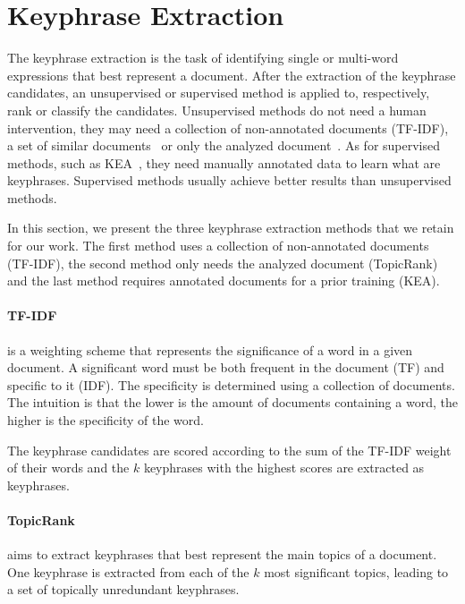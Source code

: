 \section{Keyphrase Extraction}
\label{sec:keyphrase_extraction}
  The keyphrase extraction is the task of identifying single or multi-word
  expressions that best represent a document. After the extraction of the
  keyphrase candidates, an unsupervised or supervised method is applied to,
  respectively, rank or classify the candidates. Unsupervised methods do not
  need a human intervention, they may need a collection of non-annotated
  documents (TF-IDF), a set of similar
  documents~\cite[ExpandRank]{wan2008expandrank} or only the analyzed
  document~\cite[TopicRank]{bougouin2013topicrank}. As for supervised methods,
  such as KEA~\cite{witten1999kea}, they need manually annotated data to learn
  what are keyphrases. Supervised methods usually achieve better results than
  unsupervised methods.

  In this section, we present the three keyphrase extraction methods that we
  retain for our work. The first method uses a collection of non-annotated
  documents (TF-IDF), the second method only needs the analyzed document
  (TopicRank) and the last method requires annotated documents for a prior
  training (KEA).

  \paragraph{TF-IDF} is a weighting scheme that represents the significance of a
  word in a given document. A significant word must be both frequent in the
  document (TF) and specific to it (IDF). The specificity is determined using a
  collection of documents. The intuition is that the lower is the amount of
  documents containing a word, the higher is the specificity of the word.

  The keyphrase candidates are scored according to the sum of the TF-IDF weight
  of their words and the $k$ keyphrases with the highest scores are extracted as
  keyphrases.

  \paragraph{TopicRank} aims to extract keyphrases that best represent the main
  topics of a document. One keyphrase is extracted from each of the $k$ most
  significant topics, leading to a set of topically unredundant keyphrases.

